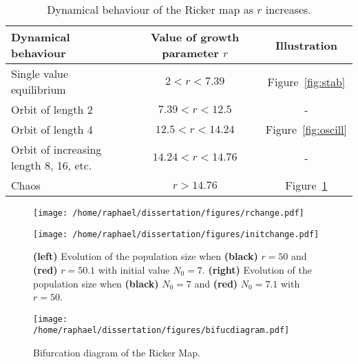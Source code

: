 \documentclass[12pt]{article}
\newcommand{\ra}[1]{\renewcommand{\arraystretch}{#1}}
\begin{document}
	\begin{table}[htb]
		\centering
		\vspace{5mm}
		\ra{1.3}
		\begin{tabular}{@{}lcc@{}} \toprule
			Dynamical behaviour & Value of growth parameter $r$ &  Illustration \\ \midrule
			Single value equilibrium & $2<r<7.39$ & Figure~\ref{fig:stab}\\ 
			Orbit of length 2 & $7.39<r<12.5$ & - \\ 
			Orbit of length 4 & $12.5<r<14.24$ & Figure~\ref{fig:oscill}\\ 
			Orbit of increasing length 8, 16, etc. & $14.24<r<14.76$ & - \\ 
			Chaos &  $r>14.76$ &  Figure~\ref{fig:chaos} \\ \bottomrule
		\end{tabular}
		\caption{Dynamical behaviour of the Ricker map as $r$ increases.}
		\label{valuesr}
		\vspace{5mm}
	\end{table}	
	
	\begin{figure}[htb]
		\centering
		\begin{minipage}{0.49\textwidth}
			\centering
			\texttt{[image: /home/raphael/dissertation/figures/rchange.pdf]}
		\end{minipage}
		\begin{minipage}{0.49\textwidth}
			\centering
			\texttt{[image: /home/raphael/dissertation/figures/initchange.pdf]}
		\end{minipage}
		\caption[Examples of the chaotic behaviour of the Ricker map.]{\textbf{(left)} Evolution of the population size when \textbf{(black)} $r=50$ and \textbf{(red)} $r=50.1$ with initial value $N_0=7$. \textbf{(right)} Evolution of the population size when \textbf{(black)} $N_0=7$ and \textbf{(red)} $N_0=7.1$ with $r=50$.}
		\label{fig:chaos}
	\end{figure}

	\begin{figure}[htb]
		\centering
		\begin{minipage}{0.9\textwidth}
			\centering
			\texttt{[image: /home/raphael/dissertation/figures/bifucdiagram.pdf]}
		\end{minipage}
		\caption{Bifurcation diagram of the Ricker Map.}
		\label{fig:stability}
	\end{figure}
	
\end{document}
